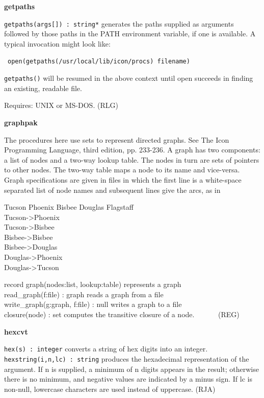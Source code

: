 {\sffamily\bfseries
getpaths}

\texttt{getpaths(args[]) : string*} generates the paths supplied as
arguments followed by those paths in the PATH environment variable, if one is available. A typical
invocation might look like:

\ \texttt{open(getpaths({\textquotedbl}/usr/local/lib/icon/procs{\textquotedbl})
{\textbar}{\textbar} filename)}

\texttt{getpaths()} will be resumed in the above context until open
succeeds in finding an existing, readable file.

Requires: UNIX or MS-DOS. (RLG)

{\sffamily\bfseries
graphpak}

The procedures here use sets to represent directed graphs.
See {\textquotedbl}The Icon Programming Language{\textquotedbl}, third
edition, pp. 233-236. A graph has two components: a list of nodes and a
two-way lookup table. The nodes in turn are sets of
pointers to other nodes. The two-way table maps a node
to its name and vice-versa. Graph specifications are given in files in
which the first line is a white-space separated list of node names and
subsequent lines give the arcs, as in

Tucson Phoenix Bisbee Douglas Flagstaff\\
Tucson-{\textgreater}Phoenix\\
Tucson-{\textgreater}Bisbee\\
Bisbee-{\textgreater}Bisbee\\
Bisbee-{\textgreater}Douglas\\
Douglas-{\textgreater}Phoenix\\
Douglas-{\textgreater}Tucson

record graph(nodes:list, lookup:table) represents a graph\\
read\_graph(f:file) : graph reads a graph from a file\\
write\_graph(g:graph, f:file) : null writes a graph to a file\\
closure(node) : set computes the transitive closure of a node.
\ \ \ \ \ \ (REG)

{\sffamily\bfseries
hexcvt}

\texttt{hex(s) : integer} converts a string of hex digits into an
integer.\\
\texttt{hexstring(i,n,lc) : string} produces the
hexadecimal representation of the argument. If n is
supplied, a minimum of n digits appears in the result; otherwise there
is no minimum, and negative values are indicated by a minus sign. If lc
is non-null, lowercase characters are used instead of uppercase. (RJA)

